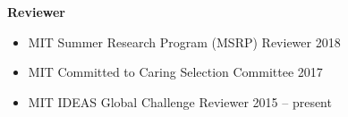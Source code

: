 \documentclass[10pt]{article}
\renewcommand{\section}[1]{\pagebreak[3]%
    \hyphenpenalty=10000%
    \vspace{1.3\baselineskip}%
    \phantomsection\addcontentsline{toc}{section}{#1}%
    \noindent\llap{\scshape\smash{\parbox[t]{\marginparwidth}{\raggedright #1}}}%
    \vspace{-\baselineskip}\par}
\newenvironment{outerlist}[1][\enskip\textbullet]%
        {\begin{itemize}[#1,leftmargin=*]}{\end{itemize}%
         \vspace{-.6\baselineskip}}
\begin{document}
\textbf{Reviewer}
\begin{outerlist}
	\item[] MIT Summer Research Program (MSRP) Reviewer \hfill {2018} 
	\item[] MIT Committed to Caring Selection Committee \hfill {2017} 
	\item[] MIT IDEAS Global Challenge Reviewer \hfill {2015 -- present} 
	\end{outerlist}
\vspace{.15in}

%
\end{document}
